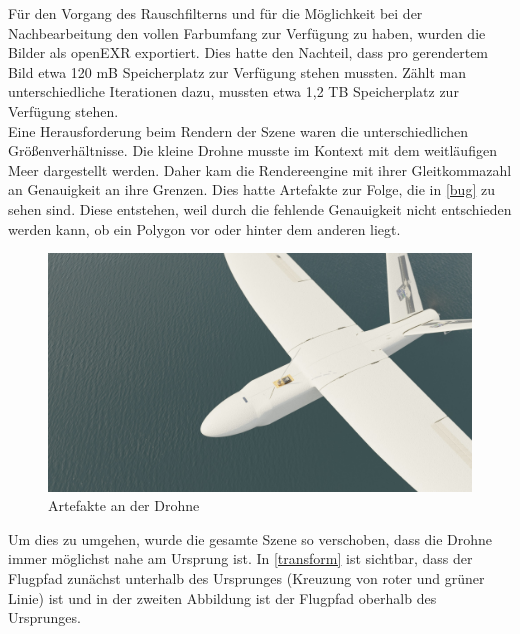 Für den Vorgang des Rauschfilterns und für die Möglichkeit bei der Nachbearbeitung den vollen Farbumfang zur Verfügung zu haben, wurden die Bilder als openEXR exportiert. Dies hatte den Nachteil, dass pro gerendertem Bild etwa 120 mB Speicherplatz zur Verfügung stehen mussten. Zählt man unterschiedliche Iterationen dazu, mussten etwa 1,2 TB Speicherplatz zur Verfügung stehen.\\
Eine Herausforderung beim Rendern der Szene waren die unterschiedlichen Größenverhältnisse. Die kleine Drohne musste im Kontext mit dem weitläufigen Meer dargestellt werden. Daher kam die Rendereengine mit ihrer Gleitkommazahl an Genauigkeit an ihre Grenzen. Dies hatte Artefakte zur Folge, die in \autoref{bug} zu sehen sind. Diese entstehen, weil durch die fehlende Genauigkeit nicht entschieden werden kann, ob ein Polygon vor oder hinter dem anderen liegt.

\begin{figure}[H]
\begin{center}
\includegraphics[width=\textwidth]{gfx/prod/plane/bug.jpg}
\caption{Artefakte an der Drohne}
\label{bug}
\end{center}
\end{figure}


Um dies zu umgehen, wurde die gesamte Szene so verschoben, dass die Drohne immer möglichst nahe am Ursprung ist. In \autoref{transform} ist sichtbar, dass der Flugpfad zunächst unterhalb des Ursprunges (Kreuzung von roter und grüner Linie) ist und in der zweiten Abbildung ist der Flugpfad oberhalb des Ursprunges.

